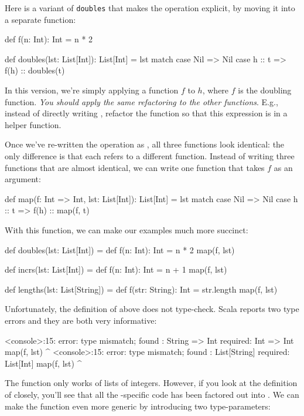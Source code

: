 \documentclass{book}
\begin{document}
Here is a variant of \verb|doubles| that makes the operation explicit, by
moving it into a separate function:
%
\begin{scalacode}
def f(n: Int): Int = n * 2

def doubles(lst: List[Int]): List[Int] = lst match {
  case Nil => Nil
  case h :: t => f(h) :: doubles(t)
}
\end{scalacode}

In this version, we're simply applying a function $f$ to $h$, where $f$
is the doubling function. \emph{You should apply the same refactoring to the other
functions}. E.g.,  instead of directly writing , refactor
the function so that this expression is in a helper function.

Once we've re-written the operation as , all three
functions look identical: the only difference is that each refers to a
different function.
Instead of writing three functions that are almost identical, we can
write one function that takes $f$ as an argument:

\begin{scalacode}
def map(f: Int => Int, lst: List[Int]): List[Int] = lst match {
  case Nil => Nil
  case h :: t => f(h) :: map(f, t)
}
\end{scalacode}

With this function, we can make our examples much more succinct:

\begin{scalacode}
def doubles(lst: List[Int]) = {
  def f(n: Int): Int = n * 2
  map(f, lst)
}

def incrs(lst: List[Int]) = {
  def f(n: Int): Int = n + 1
  map(f, lst)
}

def lengths(lst: List[String]) = {
  def f(str: String): Int = str.length
  map(f, lst)
}
\end{scalacode}

Unfortunately, the definition of  above does not
type-check. Scala reports two type errors and they are both very informative:

\begin{console}
<console>:15: error: type mismatch;
 found   : String => Int
 required: Int => Int
         map(f, lst)
             ^
<console>:15: error: type mismatch;
 found   : List[String]
 required: List[Int]
         map(f, lst)
                  ^
\end{console}

The  function only works of lists of integers. However, if you
look at the definition of  closely, you'll see that all the
-specific code has been factored out into . We
can make the function even more generic by introducing two type-parameters:
\end{document}
